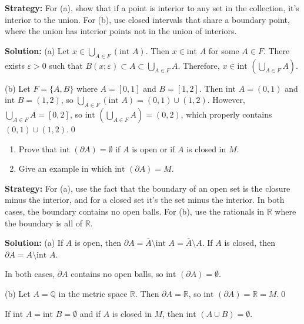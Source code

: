 \noindent\textbf{Strategy:} For (a), show that if a point is interior to any set in the collection, it's interior to the union. For (b), use closed intervals that share a boundary point, where the union has interior points not in the union of interiors.

\bigskip\noindent\textbf{Solution:} 
(a) Let $x \in \bigcup_{A \in F} (\text{int } A)$. Then $x \in \text{int } A$ for some $A \in F$. There exists $\varepsilon > 0$ such that $B(x;\varepsilon) \subset A \subset \bigcup_{A \in F} A$. Therefore, $x \in \text{int }(\bigcup_{A \in F} A)$.

(b) Let $F = \{A, B\}$ where $A = [0,1]$ and $B = [1,2]$. Then $\text{int } A = (0,1)$ and $\text{int } B = (1,2)$, so $\bigcup_{A \in F} (\text{int } A) = (0,1) \cup (1,2)$. However, $\bigcup_{A \in F} A = [0,2]$, so $\text{int }(\bigcup_{A \in F} A) = (0,2)$, which properly contains $(0,1) \cup (1,2)$.\qed


\begin{problembox}
\begin{enumerate}[label=\alph*)]
\item Prove that \(\text{int } (\partial A) = \emptyset\) if \( A \) is open or if \( A \) is closed in \( M \).
\item Give an example in which \(\text{int } (\partial A) = M\).
\end{enumerate}
\end{problembox}

\noindent\textbf{Strategy:} For (a), use the fact that the boundary of an open set is the closure minus the interior, and for a closed set it's the set minus the interior. In both cases, the boundary contains no open balls. For (b), use the rationals in $\mathbb{R}$ where the boundary is all of $\mathbb{R}$.

\bigskip\noindent\textbf{Solution:} 
(a) If $A$ is open, then $\partial A = \overline{A} \setminus \text{int } A = \overline{A} \setminus A$. If $A$ is closed, then $\partial A = A \setminus \text{int } A$.

In both cases, $\partial A$ contains no open balls, so $\text{int } (\partial A) = \emptyset$.

(b) Let $A = \mathbb{Q}$ in the metric space $\mathbb{R}$. Then $\partial A = \mathbb{R}$, so $\text{int } (\partial A) = \mathbb{R} = M$.\qed


\begin{problembox}
If \(\text{int } A = \text{int } B = \emptyset\) and if \(A\) is closed in \(M\), then \(\text{int } (A \cup B) = \emptyset\).
\end{problembox}

